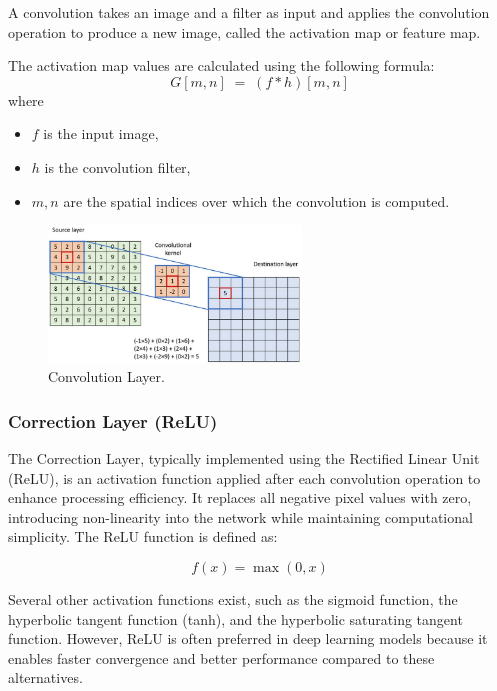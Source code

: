 A convolution takes an image and a filter as input and applies the convolution operation to produce a new image, called the activation map or feature map.

The activation map values are calculated using the following formula:
\begin{equation}
  G[m,n] \;=\; (f * h)[m,n]
\end{equation}
where
\begin{itemize}
  \item $f$ is the input image,
  \item $h$ is the convolution filter,
  \item $m,n$ are the spatial indices over which the convolution is computed.

\end{itemize}
\begin{figure}[H]
  \centering
  \includegraphics[width=0.6\textwidth]{Images/Chapter1/conv.png}
  \caption{Convolution Layer.}
  \label{fig:conv}
\end{figure}

\subsubsection{Correction Layer (ReLU)}

The Correction Layer, typically implemented using the Rectified Linear Unit (ReLU), is an activation function applied after each convolution operation to enhance processing efficiency. It replaces all negative pixel values with zero, introducing non-linearity into the network while maintaining computational simplicity. The ReLU function is defined as:

\begin{equation}
  f(x) = \max(0, x)
\end{equation}

Several other activation functions exist, such as the sigmoid function, the hyperbolic tangent function (tanh), and the hyperbolic saturating tangent function. However, ReLU is often preferred in deep learning models because it enables faster convergence and better performance compared to these alternatives.

